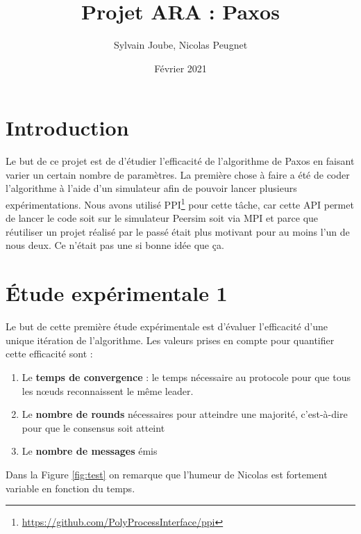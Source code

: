 \documentclass[french]{article}
\title{Projet ARA : Paxos}
\date{Février 2021}
\author{Sylvain Joube, Nicolas Peugnet}
\begin{document}
\maketitle

\tableofcontents

\section{Introduction}

Le but de ce projet est de d'étudier l'efficacité de l'algorithme de Paxos en faisant varier un certain nombre de paramètres.
La première chose à faire a été de coder l'algorithme à l'aide d'un simulateur afin de pouvoir lancer plusieurs expérimentations.
Nous avons utilisé PPI\footnote{\url{https://github.com/PolyProcessInterface/ppi}} pour cette tâche,
car cette API permet de lancer le code soit sur le simulateur Peersim soit via MPI et parce que réutiliser un projet réalisé par le passé était plus motivant pour au moins l'un de nous deux.
Ce n'était pas une si bonne idée que ça.

\section{Étude expérimentale 1}

Le but de cette première étude expérimentale est d'évaluer l'efficacité d'une unique itération de l'algorithme.
Les valeurs prises en compte pour quantifier cette efficacité sont :

\begin{enumerate}
	\item Le \textbf{temps de convergence} : le temps nécessaire au protocole pour que tous les nœuds reconnaissent le même leader.
	\item Le \textbf{nombre de rounds} nécessaires pour atteindre une majorité, c’est-à-dire pour que le consensus soit atteint
	\item Le \textbf{nombre de messages} émis
\end{enumerate}








Dans la Figure \ref{fig:test} on remarque que l'humeur de Nicolas est fortement variable en fonction du temps.
\end{document}
